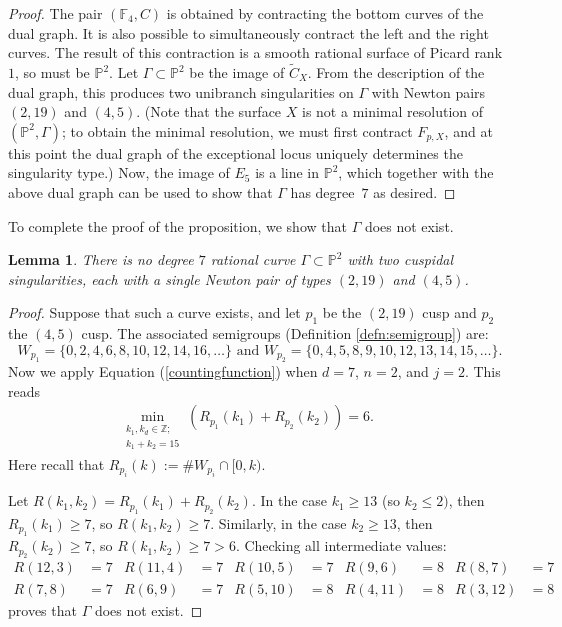 \documentclass[JEP,XML,SOM,Unicode,NoFloatCountersInSection,published]{cedram}
\theoremstyle{plain}
\newtheorem{lemma}[theorem]{Lemma}
\theoremstyle{definition}
\newcommand\FF{{\mathbb F}}
\newcommand\PP{{\mathbb{P}}}
\newcommand\ZZ{{\mathbb Z}}
\newcommand\Ct{{\widetilde{C}}}
\begin{document}
\begin{proof}
The pair $(\FF_4,C)$ is obtained by contracting the bottom curves of the dual graph. It is also possible to simultaneously contract the left and the right curves. The result of this contraction is a smooth rational surface of Picard rank~$1$, so must be $\PP^2$. Let $\Gamma \subset \PP^2$ be the image of $\Ct_X$. From the description of the dual graph, this produces two unibranch singularities on $\Gamma$ with Newton pairs $(2,19)$ and $(4,5)$. (Note that the surface $X$ is not a minimal resolution of $(\PP^2,\Gamma)$; to obtain the minimal resolution, we must first contract $F_{p,X}$, and at this point the dual graph of the exceptional locus uniquely determines the singularity type.) Now, the image of $E_5$ is a line in $\PP^2$, which together with the above dual graph can be used to show that $\Gamma$ has degree~$7$ as desired.
\end{proof}

To complete the proof of the proposition, we show that $\Gamma$ does not exist.

\begin{lemma}
There is no degree $7$ rational curve $\Gamma\subset \PP^2$ with two cuspidal singularities, each with a single Newton pair of types $(2,19)$ and $(4,5)$.
\end{lemma}

\begin{proof}
Suppose that such a curve exists, and let $p_1$ be the $(2,19)$ cusp and $p_2$ the $(4,5)$ cusp. The associated semigroups (Definition \ref{defn:semigroup}) are:
\[
W_{p_1} = \{ 0 , 2, 4, 6, 8, 10, 12, 14, 16, \dots \} \text{ and }W_{p_2} = \{ 0 , 4 , 5, 8, 9, 10, 12, 13, 14, 15, \dots \}.
\]
Now we apply Equation (\ref{countingfunction}) when $d = 7$, $n = 2$, and $j = 2$. This reads
\begin{align}
\min_{\substack{k_1, k_d \in \ZZ; \\ k_1 + k_2 = 15}} ( R_{p_1}(k_1) + R_{p_2}(k_2)) = 6. \qquad
\end{align}
Here recall that $R_{p_i}(k):= \#W_{p_i}\cap [0,k)$.

Let $R(k_1, k_2) \!=\! R_{p_1}(k_1) + R_{p_2}(k_2)$. In the case $k_1 \!\ge\! 13$ (so $k_2 \!\le\! 2)$, then $R_{p_1}(k_1)\!\ge\! 7$, so $R(k_1, k_2) \!\ge\! 7$. Similarly, in the case $k_2 \!\ge\! 13$, then $R_{p_2}(k_2) \!\ge\! 7$, so $R(k_1, k_2) \!\ge\! 7 \!>\! 6$. Checking all intermediate values:
\[
\begin{aligned}
R(12, 3) &= 7& R(11,4) &= 7& R(10,5) &= 7& R(9,6) &= 8& R(8,7) &= 7\\
R(7,8) &= 7& R(6,9) &= 7& R(5,10) &= 8& R(4,11) &= 8& R(3,12) &= 8
\end{aligned}
\]
proves that $\Gamma$ does not exist.
\end{proof}
\end{document}
